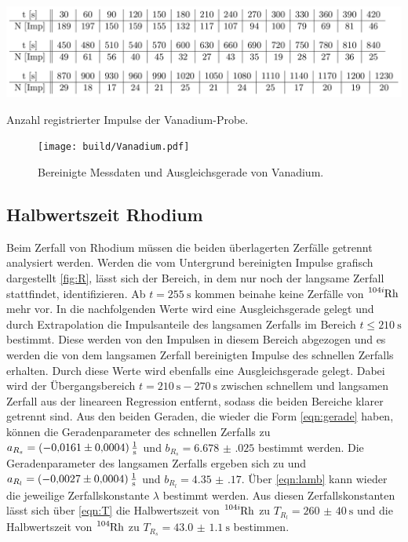 \begin{table}
\centering
\includegraphics[width=\textwidth]{data/Vanadium.png}
\caption{Anzahl registrierter Impulse der Vanadium-Probe.}
\label{tab:V}
\end{table}

\begin{figure}
\centering
\texttt{[image: build/Vanadium.pdf]}
\caption{Bereinigte Messdaten und Ausgleichsgerade von Vanadium.}
\label{fig:V}
\end{figure}

\subsection{Halbwertszeit Rhodium}
\label{Rhodium}
Beim Zerfall von Rhodium müssen die beiden überlagerten Zerfälle getrennt analysiert werden. Werden die vom Untergrund bereinigten Impulse grafisch dargestellt \ref{fig:R}, lässt sich der Bereich, in dem nur noch der langsame Zerfall stattfindet, identifizieren. Ab $t=\SI{255}{\s}$ kommen beinahe keine Zerfälle von $\ce{^{104i}Rh}$ mehr vor. In die nachfolgenden Werte wird eine Ausgleichsgerade gelegt und durch Extrapolation die Impulsanteile des langsamen Zerfalls im Bereich $t\leq\SI{210}{\s}$ bestimmt. Diese werden von den Impulsen in diesem Bereich abgezogen und es werden die von dem langsamen Zerfall bereinigten Impulse des schnellen Zerfalls erhalten. Durch diese Werte wird ebenfalls eine Ausgleichsgerade gelegt. Dabei wird der Übergangsbereich $t=\SI{210}{\s}-\SI{270}{\s}$ zwischen schnellem und langsamen Zerfall aus der lineareen Regression entfernt, sodass die beiden Bereiche klarer getrennt sind. Aus den beiden Geraden, die wieder die Form \eqref{eqn:gerade} haben, können die Geradenparameter des schnellen Zerfalls zu $a_{R_s}=\SI{-0.0161(0004)}{\frac{1}{\s}}$ und $b_{R_s}=\num{6.678(025)}$ bestimmt werden. Die Geradenparameter des langsamen Zerfalls ergeben sich zu und $a_{R_l}=\SI{-0.0027(0004)}{\frac{1}{\s}}$ und $b_{R_l}=\num{4.35(17)}$. Über \eqref{eqn:lamb} kann wieder die jeweilige Zerfallskonstante $\lambda$ bestimmt werden. Aus diesen Zerfallskonstanten lässt sich über \eqref{eqn:T} die Halbwertszeit von $\ce{^{104i}Rh}$ zu $T_{R_l}=\SI{260(40)}{\s}$ und die Halbwertszeit von $\ce{^{104}Rh}$ zu $T_{R_s}=\SI{43.0(11)}{\s}$ bestimmen.



